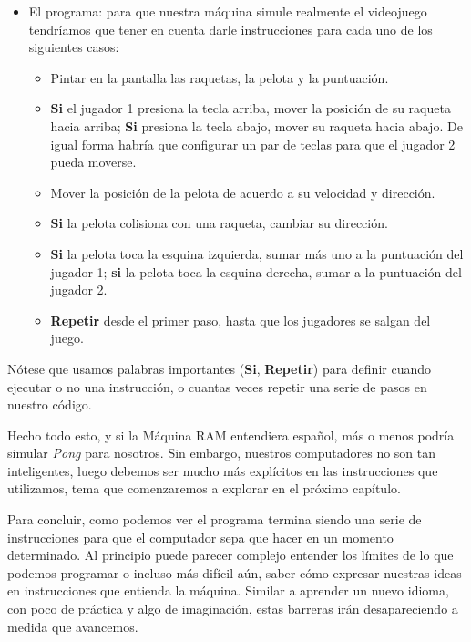 \begin{itemize}
	\item El programa: para que nuestra máquina simule realmente el videojuego tendríamos que tener en cuenta darle instrucciones para cada uno de los siguientes casos: 
	
	\begin{itemize}
		\item Pintar en la pantalla las raquetas, la pelota y la puntuación.
		
		\item \textbf{Si} el jugador 1 presiona la tecla arriba, mover la posición de su raqueta hacia arriba; \textbf{Si} presiona la tecla abajo, mover su raqueta hacia abajo. De igual forma habría que configurar un par de teclas para que el jugador 2 pueda moverse.
		
		\item Mover la posición de la pelota de acuerdo a su velocidad y dirección.
		
		\item \textbf{Si} la pelota colisiona con una raqueta, cambiar su dirección.
		
		\item \textbf{Si} la pelota toca la esquina izquierda, sumar más uno a la puntuación del jugador 1; \textbf{si} la pelota toca la esquina derecha, sumar a la puntuación del jugador 2.
				
		\item \textbf{Repetir} desde el primer paso, hasta que los jugadores se salgan del juego.
	\end{itemize}
\end{itemize}

Nótese que usamos palabras importantes (\textbf{Si}, \textbf{Repetir}) para definir cuando ejecutar o no una instrucción, o cuantas veces repetir una serie de pasos en nuestro código.

Hecho todo esto, y si la Máquina RAM entendiera español, más o menos podría simular \emph{Pong} para nosotros. Sin embargo, nuestros computadores no son tan inteligentes, luego debemos ser mucho más explícitos en las instrucciones que utilizamos, tema que comenzaremos a explorar en el próximo capítulo.

Para concluir, como podemos ver el programa termina siendo una serie de instrucciones para que el computador sepa que hacer en un momento determinado. Al principio puede parecer complejo entender los límites de lo que podemos programar o incluso más difícil aún, saber cómo expresar nuestras ideas en instrucciones que entienda la máquina. Similar a aprender un nuevo idioma, con poco de práctica y algo de imaginación, estas barreras irán desapareciendo a medida que avancemos.

